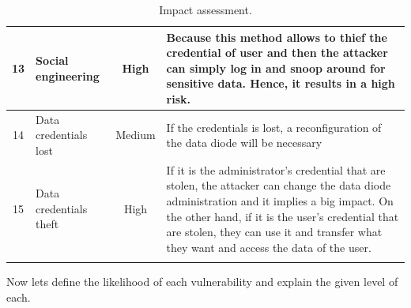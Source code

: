 \documentclass[a4paper,10pt]{article}
\begin{document}
\begin{longtable}{|c|p{2.5cm}|c|p{10cm}|}
13 & Social engineering  & High & Because this method allows to thief the credential of user and then the attacker can simply log in and snoop around for sensitive data. Hence, it results in a high risk. \\
\hline
14 & Data credentials lost & Medium & If the credentials is lost, a reconfiguration of the data diode will be necessary \\
\hline
15 & Data credentials theft & High & If it is the administrator's credential that are stolen, the attacker can change the data diode administration and it implies a big impact. On the other hand, if it is the user's credential that are stolen, they can use it and transfer what they want and access the data of the user.  \\
\hline
\caption{Impact assessment.}
\label{tab:impact}
\end{longtable}

Now lets define the likelihood of each vulnerability and explain the given level of each.
\end{document}

